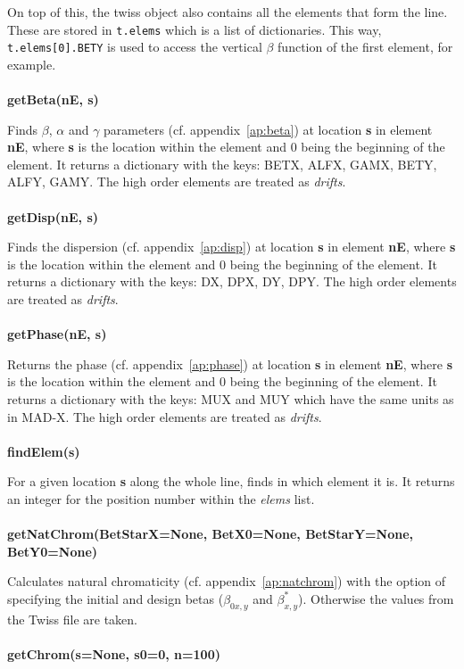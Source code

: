 \documentclass[a4paper]{cernatsnote}
\begin{document}
On top of this, the twiss object also contains all the elements that
form the line. These are stored in \texttt{t.elems} which is a list of
dictionaries. This way, \texttt{t.elems[0].BETY} is used to access the
vertical $\beta$ function of the first element, for example.
\\\\
\textbf{getBeta(nE, s)}

Finds $\beta$, $\alpha$ and $\gamma$ parameters (cf.
appendix~\ref{ap:beta}) at location \textbf{s} in element \textbf{nE},
where \textbf{s} is the location within the element and 0 being the
beginning of the element. It returns a dictionary with the keys: BETX,
ALFX, GAMX, BETY, ALFY, GAMY. The high order elements are treated as
\textit{drifts}.
\\\\
\textbf{getDisp(nE, s)}

Finds the dispersion (cf. appendix~\ref{ap:disp}) at location
\textbf{s} in element \textbf{nE}, where \textbf{s} is the location
within the element and 0 being the beginning of the element. It
returns a dictionary with the keys: DX, DPX, DY, DPY. The high order
elements are treated as \textit{drifts}.
\\\\
\textbf{getPhase(nE, s)}

Returns the phase (cf. appendix~\ref{ap:phase}) at location \textbf{s}
in element \textbf{nE}, where \textbf{s} is the location within the
element and 0 being the beginning of the element. It returns a
dictionary with the keys: MUX and MUY which have the same units as in
\textsc{MAD-X}. The high order elements are treated as \textit{drifts}.
\\\\
\textbf{findElem(s)}

For a given location \textbf{s} along the whole line, finds in
which element it is. It returns an integer for the position number
within the \textit{elems} list.
\\\\
\textbf{getNatChrom(BetStarX=None, BetX0=None, BetStarY=None, BetY0=None)}

Calculates natural chromaticity (cf. appendix~\ref{ap:natchrom}) with the
option of specifying the initial and design betas ($\beta_{0x,y}$ and
$\beta^*_{x,y}$). Otherwise the values from the Twiss file are taken.
\\\\
\textbf{getChrom(s=None, s0=0, n=100)}
\end{document}
